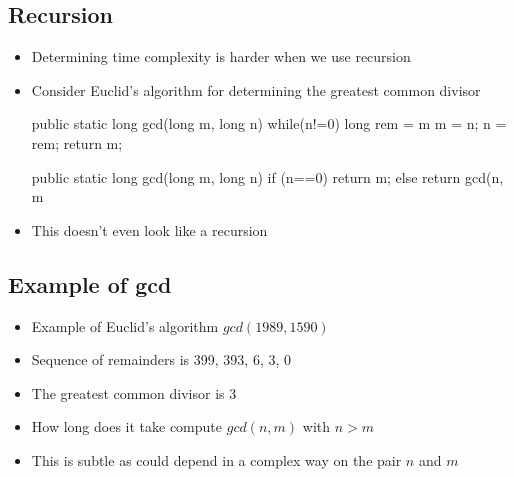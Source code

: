 
\begin{slide}
\section[-1]{Recursion}

\begin{PauseHighLight}
  \begin{itemize}
  \item Determining time complexity is harder when we use
    recursion\pause
  \item Consider Euclid's algorithm for determining the greatest common
    divisor

    \begin{minipage}{11cm}
\begin{java}
  public static
  long gcd(long m, long n)
  {
    while(n!=0) {
      long rem = m%
      m = n;
      n = rem;
    }
    return m;
  }
\end{java} \pause
    \end{minipage}\hfill%
    \begin{minipage}{11cm}
\begin{java}
  public static
  long gcd(long m, long n)
  {
    if (n==0)
      return m;
    else
      return gcd(n, m%
  }
\end{java}  \pause 
    \end{minipage}
\item This doesn't even look like a recursion\pause
  \end{itemize}
\end{PauseHighLight}

\end{slide}


\begin{slide}
\section{Example of gcd}

\begin{PauseHighLight}
  \begin{itemize}
  \item Example of Euclid's algorithm \jl$gcd(1989,1590)$\pause
  \item Sequence of remainders is 399, 393, 6, 3, 0\pause
  \item The greatest common divisor is 3\pause
  \item How long does it take compute \jl$gcd(n,m)$ with $n>m$\pause
  \item This is subtle as could depend in a complex way on the pair $n$
    and $m$\pause
  \end{itemize}
\end{PauseHighLight}

\end{slide}

